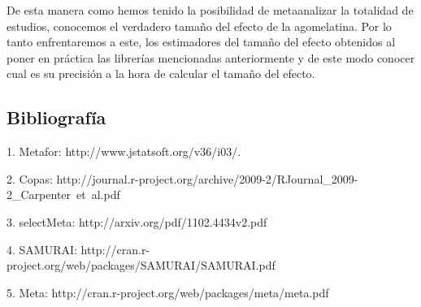 De esta manera como hemos tenido la posibilidad de metaanalizar la totalidad de estudios, conocemos el verdadero tamaño del efecto de la agomelatina. Por lo tanto enfrentaremos a este, los estimadores del tamaño del efecto obtenidos al poner en práctica las librerías mencionadas anteriormente y de este modo conocer cual es su precisión a la hora de calcular el tamaño del efecto.


 \bigskip\subsection*{Bibliografía}

 1. Metafor: http://www.jstatsoft.org/v36/i03/. 

2. Copas: http://journal.r-project.org/archive/2009-2/RJournal\_2009-2\_Carpenter~et~al.pdf 

3. selectMeta: http://arxiv.org/pdf/1102.4434v2.pdf

4. SAMURAI: http://cran.r-project.org/web/packages/SAMURAI/SAMURAI.pdf

5. Meta: http://cran.r-project.org/web/packages/meta/meta.pdf

%

%
